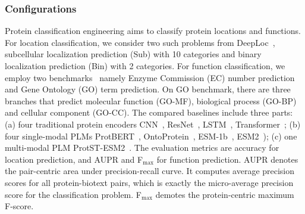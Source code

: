 \subsubsection{Configurations}
Protein classification engineering aims to classify protein locations and functions. For location classification, we consider two such problems from DeepLoc~\cite{DeepLoc}, subcellular localization prediction (Sub) with 10 categories and binary localization prediction (Bin) with 2 categories. For function classification, we employ two benchmarks~\cite{DeepFRI} namely Enzyme Commission (EC) number prediction and Gene Ontology (GO) term prediction. On GO benchmark, there are three branches that predict molecular function (GO-MF), biological process (GO-BP) and cellular component (GO-CC).
The compared baselines include three parts: (a) four traditional protein encoders CNN~\cite{CNN}, ResNet~\cite{TAPE}, LSTM~\cite{TAPE}, Transformer~\cite{TAPE}; (b) 
four single-modal PLMs ProtBERT~\cite{ProtTrans}, OntoProtein~\cite{OntoProtein}, ESM-1b~\cite{esm-1b}, ESM2~\cite{esm-2}); (c) one multi-modal PLM ProtST-ESM2~\cite{ProtST}.
The evaluation metrics are accuracy for location prediction, and AUPR and F$_\text{max}$ for function prediction. AUPR denotes the pair-centric area under precision-recall curve. It computes average precision scores for all protein-biotext pairs, which is exactly the micro-average precision score for the classification problem. F$_\text{max}$ demotes the protein-centric maximum F-score.
